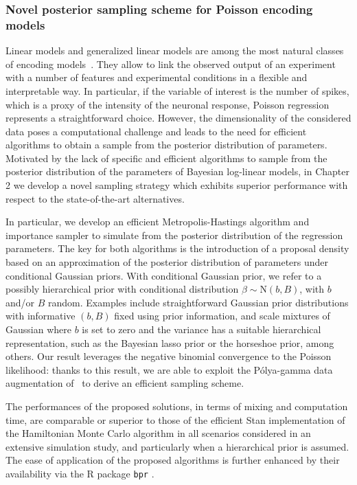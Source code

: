 \subsubsection{Novel posterior sampling scheme for Poisson encoding models}
Linear models and generalized linear models are among the most natural classes of encoding models~\parencite{paninski2007}. They allow to link the observed output of an experiment with a number of features and experimental conditions in a flexible and interpretable way. In particular, if the variable of interest is the number of spikes, which is a proxy of the intensity of the neuronal response, Poisson regression represents a straightforward choice. However, the dimensionality of the considered data poses a computational challenge and leads to the need for efficient algorithms to obtain a sample from the posterior distribution of parameters. 
Motivated by the lack of specific and efficient algorithms to sample from the posterior distribution of the parameters
of Bayesian log-linear models, in Chapter 2 we develop a novel sampling strategy which exhibits superior performance with respect to the state-of-the-art alternatives. 

In particular, we develop an efficient Metropolis-Hastings algorithm and importance sampler to simulate from the posterior distribution of the regression parameters.
The key for both algorithms is the introduction of a proposal density based on an approximation of the posterior distribution of parameters under conditional Gaussian priors. 
With conditional Gaussian prior, we refer to a possibly hierarchical prior with conditional distribution $\beta \sim \mathrm{N}(b, B)$, with $b$ and/or $B$ random. Examples include straightforward Gaussian prior distributions with informative $(b,B)$ fixed using prior information, and scale mixtures of Gaussian where $b$ is set to zero and the variance has a suitable hierarchical representation, such as the Bayesian lasso prior or the horseshoe prior, among others.
Our result leverages the negative binomial convergence to
the Poisson likelihood: thanks to this result, we are able to exploit the P\'olya-gamma data augmentation of~\textcite{polson_scott_2013} to derive an efficient sampling scheme. 

The performances of the proposed solutions, in terms of mixing and computation time, are comparable or superior to those of the efficient Stan implementation of the Hamiltonian Monte Carlo algorithm in all scenarios considered in an extensive simulation study, and particularly when a hierarchical prior is assumed. 
The ease of application of the proposed algorithms is further enhanced by their availability via the R package \texttt{bpr} \parencite{bpr}.


